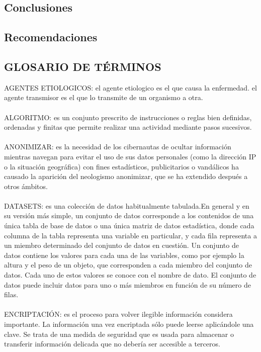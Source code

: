 \documentclass[a4paper,openright,12pt]{book}
\theoremstyle{definition}
\theoremstyle{remark}
\begin{document}
\section{Conclusiones}


\section{Recomendaciones}

\clearpage

\begin{center}
 \chapter{GLOSARIO DE TÉRMINOS}\label{cap.glosario}
\end{center}
AGENTES ETIOLOGICOS: el agente etiologico es el que causa la enfermedad. el agente transmisor es el que lo transmite de un organismo a otra.\\\\
ALGORITMO: es un conjunto prescrito de instrucciones o reglas bien definidas, ordenadas y finitas que permite realizar una actividad mediante pasos sucesivos. \\\\
ANONIMIZAR: es la necesidad de los cibernautas de ocultar información mientras navegan para evitar el uso de sus datos personales (como la dirección IP o la situación geográfica) con fines estadísticos, publicitarios o vandálicos ha causado la aparición del neologismo anonimizar, que se ha extendido después a otros ámbitos.  \\\\
DATASETS: es una colección de datos habitualmente tabulada.En general y en su versión más simple, un conjunto de datos corresponde a los contenidos de una única tabla de base de datos o una única matriz de datos estadística, donde cada columna de la tabla representa una variable en particular, y cada fila representa a un miembro determinado del conjunto de datos en cuestión. Un conjunto de datos contiene los valores para cada una de las variables, como por ejemplo la altura y el peso de un objeto, que corresponden a cada miembro del conjunto de datos. Cada uno de estos valores se conoce con el nombre de dato. El conjunto de datos puede incluir datos para uno o más miembros en función de su número de filas.\\\\
ENCRIPTACIÓN: es el proceso para volver ilegible información considera importante. La información una vez encriptada sólo puede leerse aplicándole una clave. Se trata de una medida de seguridad que es usada para almacenar o transferir información delicada que no debería ser accesible a terceros.\\\\
\end{document}
